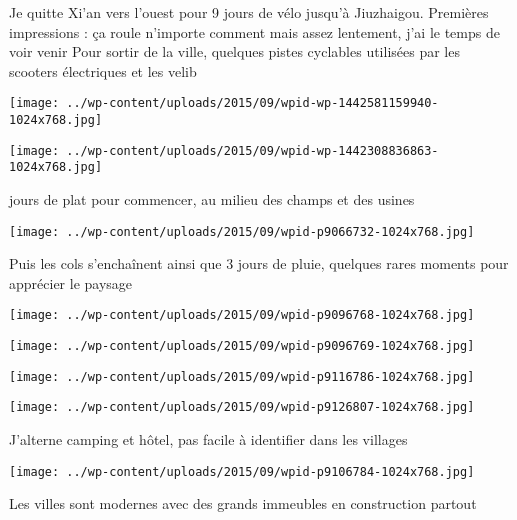  \newline
 Je quitte Xi'an vers l'ouest pour 9 jours de vélo jusqu'à Jiuzhaigou. Premières impressions : ça roule n'importe comment mais assez lentement, j'ai le temps de voir venir \newline
 Pour sortir de la ville, quelques pistes cyclables utilisées par les scooters électriques et les velib \newline
 \newline
\centerline{\texttt{[image: ../wp-content/uploads/2015/09/wpid-wp-1442581159940-1024x768.jpg]} } 
 \newline
 \newline
\centerline{\texttt{[image: ../wp-content/uploads/2015/09/wpid-wp-1442308836863-1024x768.jpg]} } 
  jours de plat pour commencer, au milieu des champs et des usines \newline
 \newline
\centerline{\texttt{[image: ../wp-content/uploads/2015/09/wpid-p9066732-1024x768.jpg]} } 
 \newline
 Puis les cols s'enchaînent ainsi que 3 jours de pluie, quelques rares moments pour apprécier le paysage \newline
 \newline
\centerline{\texttt{[image: ../wp-content/uploads/2015/09/wpid-p9096768-1024x768.jpg]} } 
 \newline
 \newline
\centerline{\texttt{[image: ../wp-content/uploads/2015/09/wpid-p9096769-1024x768.jpg]} } 
 \newline
 \newline
\centerline{\texttt{[image: ../wp-content/uploads/2015/09/wpid-p9116786-1024x768.jpg]} } 
 \newline
 \newline
\centerline{\texttt{[image: ../wp-content/uploads/2015/09/wpid-p9126807-1024x768.jpg]} } 
 \newline
 J'alterne camping et hôtel, pas facile à identifier dans les villages \newline
 \newline
\centerline{\texttt{[image: ../wp-content/uploads/2015/09/wpid-p9106784-1024x768.jpg]} } 
 \newline
 Les villes sont modernes avec des grands immeubles en construction partout \newline
